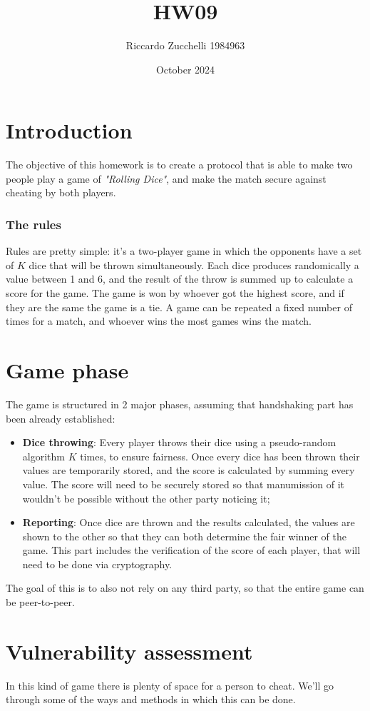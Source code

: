 \documentclass{article}
\title{HW09}
\author{Riccardo Zucchelli 1984963}
\date{October 2024}
\begin{document}
\maketitle

\section{Introduction}
The objective of this homework is to create a protocol that is able to make two people play a game of \emph{"Rolling Dice"}, and make the match secure against cheating by both players.

\subsubsection*{The rules}
Rules are pretty simple: it's a two-player game in which the opponents have a set of $K$ dice that will be thrown simultaneously. Each dice produces randomically a value between 1 and 6, and the result of the throw is summed up to calculate a score for the game. The game is won by whoever got the highest score, and if they are the same the game is a tie. A game can be repeated a fixed number of times for a match, and whoever wins the most games wins the match.

\section*{Game phase}
The game is structured in 2 major phases, assuming that handshaking part has been already established:
\begin{itemize}
    \item \textbf{Dice throwing}: Every player throws their dice using a pseudo-random algorithm $K$ times, to ensure fairness. Once every dice has been thrown their values are temporarily stored, and the score is calculated by summing every value. The score will need to be securely stored so that manumission of it wouldn't be possible without the other party noticing it;
    \item \textbf{Reporting}: Once dice are thrown and the results calculated, the values are shown to the other so that they can both determine the fair winner of the game. This part includes the verification of the score of each player, that will need to be done via cryptography.
\end{itemize}
The goal of this is to also not rely on any third party, so that the entire game can be peer-to-peer.

\section{Vulnerability assessment}
In this kind of game there is plenty of space for a person to cheat. We'll go through some of the ways and methods in which this can be done.
\end{document}
